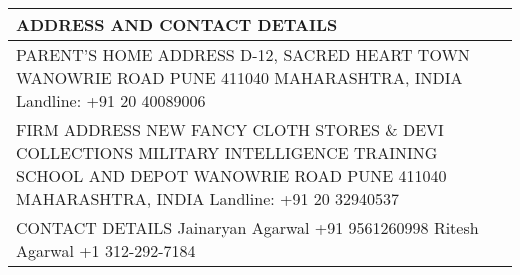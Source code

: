 \documentclass[a4paper,8pt]{extarticle}
\newcommand{\redfont}[1]{%
	{\color{textred}%
	\fontspec{Fjalla One}%
	\fontsize{14pt}{18pt}%
	\selectfont #1}}
\begin{document}
\bigskip
\begin{tabularx}{\linewidth}{X}
\large ADDRESS AND CONTACT DETAILS	\\\toprule
\redfont{PARENT'S HOME ADDRESS}\newline
D-12, SACRED HEART TOWN \newline
WANOWRIE ROAD \newline
PUNE 411040 \newline
MAHARASHTRA, INDIA \newline
Landline: +91 20 40089006 \\
\redfont{FIRM ADDRESS}\newline
NEW FANCY CLOTH STORES \& DEVI COLLECTIONS \newline
MILITARY INTELLIGENCE TRAINING SCHOOL AND DEPOT \newline
WANOWRIE ROAD \newline
PUNE 411040 \newline
MAHARASHTRA, INDIA \newline
Landline: +91 20 32940537 \\
\redfont{CONTACT DETAILS}\newline
Jainaryan Agarwal \newline
+91 9561260998 \newline 
Ritesh Agarwal \newline 
+1 312-292-7184 \\
\end{tabularx}\\
\end{document}

